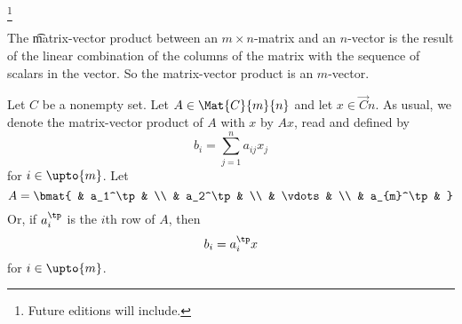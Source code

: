 
  \ifhmode\unskip\fi\footnote{
Future editions will include.
  }



The \t{matrix-vector product} between an $m \times n$-matrix and an $n$-vector is the result of the linear combination of the columns of the matrix with the sequence of scalars in the vector.
So the matrix-vector product is an $m$-vector.


Let $C$ be a nonempty set.
Let $A \in \Mat{C}{m}{n}$ and let $x \in \Vec{C}{n}$.
As usual, we denote the matrix-vector product of $A$ with $x$ by $Ax$, read  and defined by
  \[
b_i = \sum_{j = 1}^{n} a_{ij}x_j
  \]
for $i \in \upto{m}$.
Let
  \[
A = \bmat{
& a_1^\tp & \\
& a_2^\tp & \\
& \vdots & \\
& a_{m}^\tp &
}
  \]
Or, if $a_i^\tp$ is the $i$th row of $A$, then
  \[
b_i = a_i^\tp x
  \]
for $i \in \upto{m}$.

\blankpage
